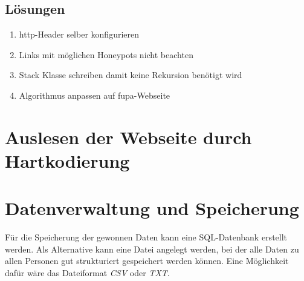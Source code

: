 	
	\subsection{Lösungen}
	\begin{enumerate}
		\item http-Header selber konfigurieren
		\item Links mit möglichen Honeypots nicht beachten
		\item Stack Klasse schreiben damit keine Rekursion benötigt wird
		\item Algorithmus anpassen auf fupa-Webseite
	\end{enumerate}

\section{Auslesen der Webseite durch Hartkodierung}

\section{Datenverwaltung und Speicherung}
Für die Speicherung der gewonnen Daten kann eine SQL-Datenbank erstellt werden.
Als Alternative kann eine Datei angelegt werden, bei der alle Daten zu allen Personen gut strukturiert gespeichert werden können. Eine Möglichkeit dafür wäre das Dateiformat \textit{CSV} oder \textit{TXT}.